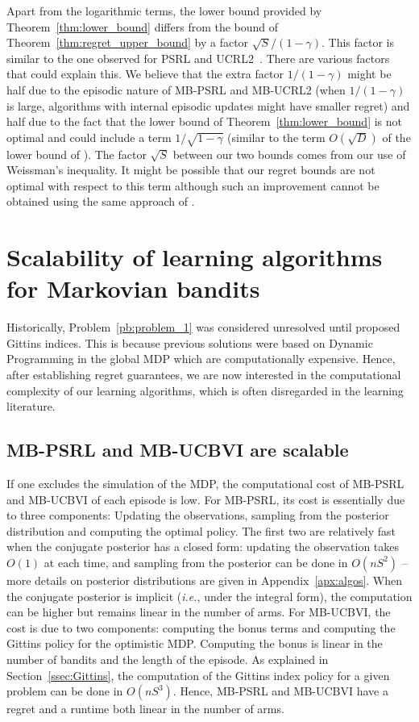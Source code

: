 Apart from the logarithmic terms, the lower bound provided by Theorem~\ref{thm:lower_bound} differs from the bound of Theorem~\ref{thm:regret_upper_bound} by a factor $\sqrt{S}/(1-\gamma)$. This factor is similar to the one observed for PSRL and UCRL2~\cite{osband2013more,jaksch2010near}. There are various factors that could explain this. We believe that the extra factor  $1/(1-\gamma)$ might be half due to the episodic nature of MB-PSRL and MB-UCRL2 (when $1/(1-\gamma)$ is large, algorithms with internal episodic updates might have smaller regret) and half due to the fact that the lower bound of Theorem~\ref{thm:lower_bound} is not optimal and could include a term $1/\sqrt{1-\gamma}$ (similar to the term $O(\sqrt{D})$ of the lower bound of \cite{osband2016lower,jaksch2010near}). The factor $\sqrt{S}$ between our two bounds comes from our use of Weissman's inequality. It might be possible that our regret bounds  are not optimal with respect to this term although such an improvement cannot be obtained using the same approach of \cite{azar2017minimax}.

\section{Scalability of learning algorithms for Markovian bandits}
Historically, Problem~{\ref{pb:problem_1}} was considered unresolved until \cite{gittins1979bandit} proposed Gittins indices. This is because previous solutions were based on Dynamic Programming in the global MDP which are computationally expensive. Hence, after establishing regret guarantees, we are now interested in the computational complexity of our learning algorithms, which is often disregarded in the learning literature.

\subsection{MB-PSRL and MB-UCBVI are scalable}
\label{sec:OFU}

If one excludes the simulation of the MDP, the computational cost of MB-PSRL and MB-UCBVI of each episode is low. For MB-PSRL, its cost is essentially due to three components: Updating the observations, sampling from the posterior distribution and computing the optimal policy. The first two are relatively fast when the conjugate posterior has a closed form: updating the observation takes $O(1)$ at each time, and sampling from the posterior can be done in $O(nS^2)$ -- more details on posterior distributions are given in Appendix~\ref{apx:algos}. When the conjugate posterior is implicit (\emph{i.e.}, under the integral form), the computation can be higher but remains linear in the number of arms. For MB-UCBVI, the cost is due to two components: computing the bonus terms and computing the Gittins policy for the optimistic MDP. Computing the bonus is linear in the number of bandits and the length of the episode. As explained in Section~\ref{ssec:Gittins}, the computation of the Gittins index policy for a given problem can be done in $O(nS^3)$. Hence, MB-PSRL and MB-UCBVI have a regret and a runtime both linear in the number of arms.

